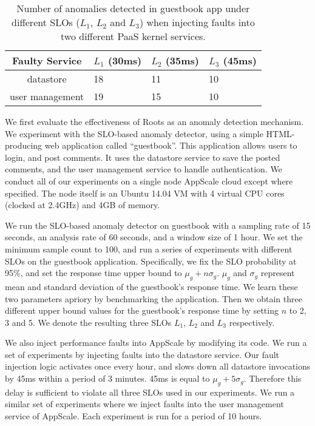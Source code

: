 \begin{table}
\begin{center}
\begin{tabular}{|c|p{1cm}|p{1cm}|p{1cm}|}
\hline
Faulty Service & $L_1$ (30ms) & $L_2$ (35ms) & $L_3$ (45ms) \\ \hline
datastore & 18 & 11 & 10 \\ \hline
user management & 19 & 15 & 10 \\ \hline
\end{tabular}
\end{center}
\caption{Number of anomalies detected in guestbook app under different SLOs 
($L_1$, $L_2$ and $L_3$) when injecting faults into two different PaaS kernel services.
\label{tab:anomaly_counts}
}
\end{table}

We first evaluate the effectiveness of Roots as an anomaly detection mechanism. We experiment with
the SLO-based anomaly detector, using a simple HTML-producing web application called ``guestbook''.
This application allows users to login, and post comments. It uses the datastore service to save
the posted comments, and the user management service to handle authentication. We conduct all
of our experiments on a single node AppScale cloud except where specified. The node itself is an Ubuntu
14.04 VM with 4 virtual CPU cores (clocked at 2.4GHz) and 4GB of memory.

We run the SLO-based anomaly detector on guestbook with a sampling rate of 15 seconds, an analysis
rate of 60 seconds, and a window size of 1 hour. We set the minimum sample count to 100, and
run a series of experiments with different SLOs on the guestbook application. Specifically, we fix
the SLO probability at 95\%, and set the response time upper bound to $\mu_g + n\sigma_g$. 
$\mu_g$ and $\sigma_g$ represent mean and standard deviation of the
guestbook's response time. We learn these two parameters apriory by benchmarking
the application. Then we obtain three different upper bound values for the guestbook's
response time by setting 
$n$ to 2, 3 and 5. We denote the resulting three SLOs $L_1$, $L_2$ and $L_3$ respectively.

We also inject performance faults into AppScale by modifying its code. We run a set of experiments
by injecting faults into the datastore service. Our fault injection logic activates once every hour, and
slows down all datastore invocations by 45ms within a period of 3 minutes. 45ms is equal 
to $\mu_g + 5\sigma_g$. Therefore this delay is sufficient to violate all three SLOs used in our experiments. 
We run a similar set of experiments where we inject faults into the user management service of
AppScale. Each experiment is run for a period of 10 hours.

